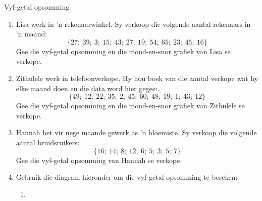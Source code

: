 \begin{wex}{Vyf-getal opsomming}
{\begin{center}
  \end{center}
}
\end{wex}

\begin{exercises}{}{
    \begin{enumerate} [itemsep=6pt, label=\textbf{\arabic*}.]

    \item Lisa werk in ’n rekenaarwinkel. Sy verkoop die volgende aantal rekenaars in ’n maand:
      \begin{equation*}
        \{27;\ 39;\ 3;\ 15;\ 43;\ 27;\ 19;\ 54;\ 65;\ 23;\ 45;\ 16\}
      \end{equation*}
     Gee die vyf-getal opsomming en die mond-en-snor grafiek van Lisa se verkope.

    \item Zithulele werk in telefoonverkope. Hy hou boek van die aantal verkope wat hy elke maand doen en die data word hier gegee:.
      \begin{equation*}
        \{49;\ 12;\ 22;\ 35;\ 2;\ 45;\ 60;\ 48;\ 19;\ 1;\ 43;\ 12\}
      \end{equation*}
    Gee die vyf-getal opsomming en die mond-en-snor grafiek van Zithulele se verkope.

    \item Hannah het vir nege maande gewerk as ’n bloemiste. Sy verkoop die volgende aantal bruidsruikers:
      \begin{equation*}
        \{16;\ 14;\ 8;\ 12;\ 6;\ 5;\ 3;\ 5;\ 7\}
      \end{equation*}
      Gee die vyf-getal opsomming van Hannah se verkope.
    \item Gebruik die diagram hieronder om die vyf-getal opsomming te bereken:
      \begin{enumerate}[noitemsep, label=\textbf{(\alph*)} ]
      \item {}
\end{enumerate}
\end{enumerate}}
\end{exercises}
